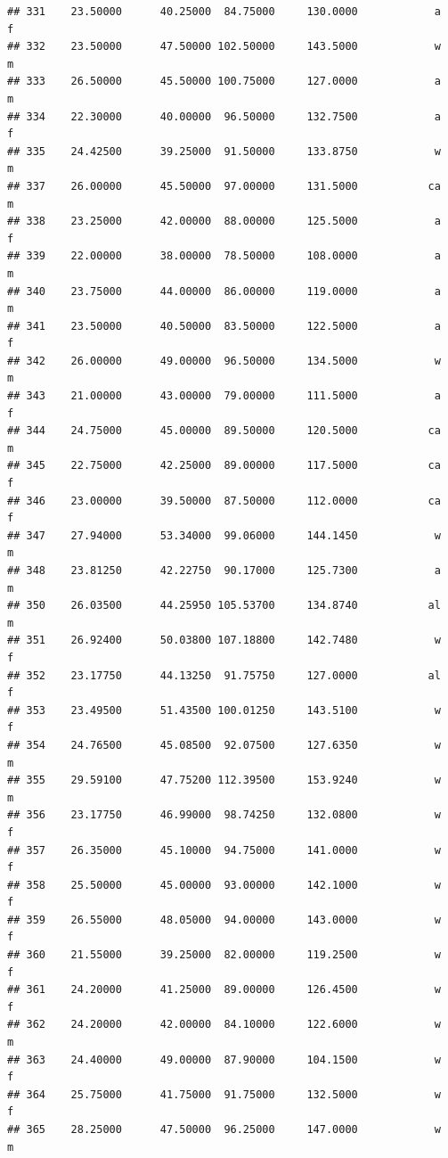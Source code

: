 \documentclass[]{article}
\begin{document}
\begin{verbatim}
## 331    23.50000      40.25000  84.75000     130.0000            a         f
## 332    23.50000      47.50000 102.50000     143.5000            w         m
## 333    26.50000      45.50000 100.75000     127.0000            a         m
## 334    22.30000      40.00000  96.50000     132.7500            a         f
## 335    24.42500      39.25000  91.50000     133.8750            w         m
## 337    26.00000      45.50000  97.00000     131.5000           ca         m
## 338    23.25000      42.00000  88.00000     125.5000            a         f
## 339    22.00000      38.00000  78.50000     108.0000            a         m
## 340    23.75000      44.00000  86.00000     119.0000            a         m
## 341    23.50000      40.50000  83.50000     122.5000            a         f
## 342    26.00000      49.00000  96.50000     134.5000            w         m
## 343    21.00000      43.00000  79.00000     111.5000            a         f
## 344    24.75000      45.00000  89.50000     120.5000           ca         m
## 345    22.75000      42.25000  89.00000     117.5000           ca         f
## 346    23.00000      39.50000  87.50000     112.0000           ca         f
## 347    27.94000      53.34000  99.06000     144.1450            w         m
## 348    23.81250      42.22750  90.17000     125.7300            a         m
## 350    26.03500      44.25950 105.53700     134.8740           al         m
## 351    26.92400      50.03800 107.18800     142.7480            w         f
## 352    23.17750      44.13250  91.75750     127.0000           al         f
## 353    23.49500      51.43500 100.01250     143.5100            w         f
## 354    24.76500      45.08500  92.07500     127.6350            w         m
## 355    29.59100      47.75200 112.39500     153.9240            w         m
## 356    23.17750      46.99000  98.74250     132.0800            w         f
## 357    26.35000      45.10000  94.75000     141.0000            w         f
## 358    25.50000      45.00000  93.00000     142.1000            w         f
## 359    26.55000      48.05000  94.00000     143.0000            w         f
## 360    21.55000      39.25000  82.00000     119.2500            w         f
## 361    24.20000      41.25000  89.00000     126.4500            w         f
## 362    24.20000      42.00000  84.10000     122.6000            w         m
## 363    24.40000      49.00000  87.90000     104.1500            w         f
## 364    25.75000      41.75000  91.75000     132.5000            w         f
## 365    28.25000      47.50000  96.25000     147.0000            w         m

\end{verbatim}
\end{document}

